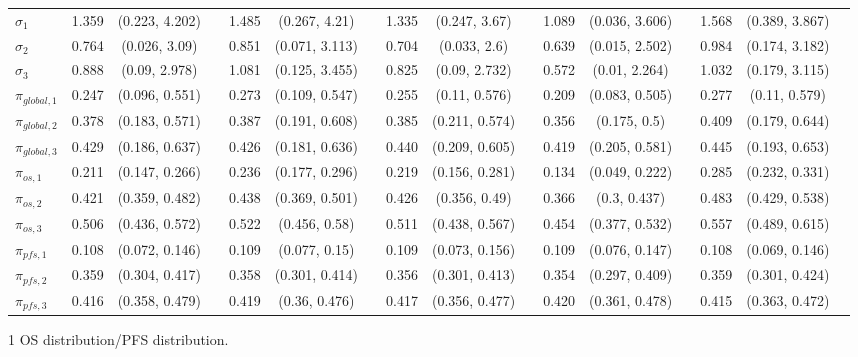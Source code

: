 \documentclass[AMA,STIX1COL]{WileyNJD-v2}
\begin{document}
\begin{landscape}
\begin{center}
\begin{table}[t]
\begin{tabular}{l c c c c c c c c c c c c c c c}
$\sigma_1$ & 1.359 & (0.223, 4.202) &  & 1.485 & (0.267, 4.21) &  & 1.335 & (0.247, 3.67) &  & 1.089 & (0.036, 3.606) &  & 1.568 & (0.389, 3.867) & \\
$\sigma_2$ & 0.764 & (0.026, 3.09) &  & 0.851 & (0.071, 3.113) &  & 0.704 & (0.033, 2.6) &  & 0.639 & (0.015, 2.502) &  & 0.984 & (0.174, 3.182) & \\
$\sigma_3$ & 0.888 & (0.09, 2.978) &  & 1.081 & (0.125, 3.455) &  & 0.825 & (0.09, 2.732) &  & 0.572 & (0.01, 2.264) &  & 1.032 & (0.179, 3.115) & \\
$\pi_{global, 1}$ & 0.247 & (0.096, 0.551) &  & 0.273 & (0.109, 0.547) &  & 0.255 & (0.11, 0.576) &  & 0.209 & (0.083, 0.505) &  & 0.277 & (0.11, 0.579) & \\
$\pi_{global, 2}$ & 0.378 & (0.183, 0.571) &  & 0.387 & (0.191, 0.608) &  & 0.385 & (0.211, 0.574) &  & 0.356 & (0.175, 0.5) &  & 0.409 & (0.179, 0.644) & \\
$\pi_{global, 3}$ & 0.429 & (0.186, 0.637) &  & 0.426 & (0.181, 0.636) &  & 0.440 & (0.209, 0.605) &  & 0.419 & (0.205, 0.581) &  & 0.445 & (0.193, 0.653) & \\
$\pi_{os, 1}$ & 0.211 & (0.147, 0.266) &  & 0.236 & (0.177, 0.296) &  & 0.219 & (0.156, 0.281) &  & 0.134 & (0.049, 0.222) &  & 0.285 & (0.232, 0.331) & \\
$\pi_{os, 2}$ & 0.421 & (0.359, 0.482) &  & 0.438 & (0.369, 0.501) &  & 0.426 & (0.356, 0.49) &  & 0.366 & (0.3, 0.437) &  & 0.483 & (0.429, 0.538) & \\
$\pi_{os, 3}$ & 0.506 & (0.436, 0.572) &  & 0.522 & (0.456, 0.58) &  & 0.511 & (0.438, 0.567) &  & 0.454 & (0.377, 0.532) &  & 0.557 & (0.489, 0.615) & \\
$\pi_{pfs, 1}$ & 0.108 & (0.072, 0.146) &  & 0.109 & (0.077, 0.15) &  & 0.109 & (0.073, 0.156) &  & 0.109 & (0.076, 0.147) &  & 0.108 & (0.069, 0.146) & \\
$\pi_{pfs, 2}$ & 0.359 & (0.304, 0.417) &  & 0.358 & (0.301, 0.414) &  & 0.356 & (0.301, 0.413) &  & 0.354 & (0.297, 0.409) &  & 0.359 & (0.301, 0.424) & \\
$\pi_{pfs, 3}$ & 0.416 & (0.358, 0.479) &  & 0.419 & (0.36, 0.476) &  & 0.417 & (0.356, 0.477) &  & 0.420 & (0.361, 0.478) &  & 0.415 & (0.363, 0.472) & \\
\bottomrule
\end{tabular}
\begin{tablenotes}%
\item[1] OS distribution/PFS distribution.
\end{tablenotes}
\end{table}
\end{center}
\end{landscape}
\end{document}
